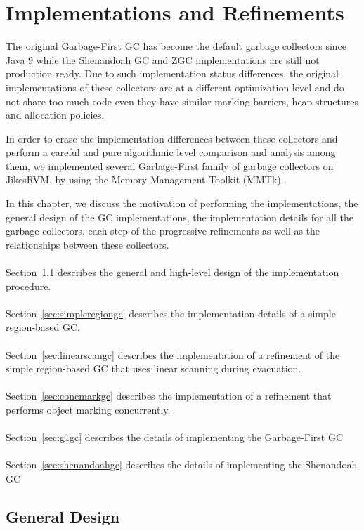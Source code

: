 \chapter{Implementations and Refinements}
\label{cha:implementation}

The original Garbage-First GC has become the default garbage collectors since Java 9
while the Shenandoah GC and ZGC implementations are still not production
ready. Due to such implementation status differences, the original implementations
of these collectors are at a different optimization level and do not share too
much code even they have similar marking barriers, heap structures and allocation policies.

In order to erase the implementation differences between these collectors and perform
a careful and pure algorithmic level comparison and analysis among them, we implemented
several  Garbage-First family of garbage collectors on JikesRVM, by using the Memory Management Toolkit (MMTk).

In this chapter, we discuss the motivation of performing the implementations,
the general design of the GC implementations,
the implementation details for all the garbage collectors,
each step of the progressive refinements as well as the relationships between these collectors.
\\\\
Section~\ref{sec:generaldesign} describes the general and high-level design of the
implementation procedure.
\\\\
Section~\ref{sec:simpleregiongc} describes the implementation details of a simple region-based GC.
\\\\
Section~\ref{sec:linearscangc} describes the implementation of a refinement of the simple region-based GC that uses linear scanning during evacuation.
\\\\
Section~\ref{sec:concmarkgc} describes the implementation of a refinement that performs object marking concurrently.
\\\\
Section~\ref{sec:g1gc} describes the details of implementing the Garbage-First GC
\\\\
Section~\ref{sec:shenandoahgc} describes the details of implementing the Shenandoah GC



\section{General Design}
\label{sec:generaldesign}

